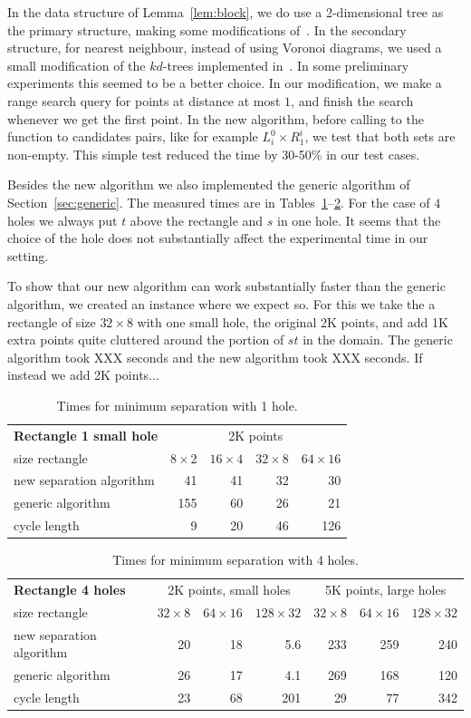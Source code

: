 \documentclass[a4paper,11pt]{article}
\begin{document}
In the data structure of Lemma~\ref{lem:block},
we do use a 2-dimensional tree as the primary structure, making some modifications
of~\cite{cgal:n-rstd-15a}. In the secondary structure, for nearest neighbour, 
instead of using Voronoi diagrams, we used a small modification of
the $kd$-trees implemented in~\cite{cgal:tf-ssd-15a}. 
In some preliminary experiments this seemed to be a better choice.
In our modification, we make a range search query for points at distance at most $1$,
and finish the search whenever we get the first point.
%
In the new algorithm, before calling to the function to candidates pairs, like for example $L_i^0\times R^i_1$,
we test that both sets are non-empty. This simple test reduced the time by 30-50\%
in our test cases.

Besides the new algorithm we also implemented the generic algorithm of Section~\ref{sec:generic}.
The measured times are in Tables~\ref{table6}--\ref{table7}.
For the case of $4$ holes we always put $t$ above the rectangle and $s$ in one hole. 
It seems that the choice of the hole does not substantially affect the experimental time in our setting.

To show that our new algorithm can work substantially faster than the generic algorithm,
we created an instance where we expect so.
For this we take the a rectangle of size $32\times 8$ with one small hole,
the original 2K points, and add 1K extra points quite cluttered
around the portion of $st$ in the domain. The generic algorithm took XXX seconds and the new
algorithm took XXX seconds. If instead we add 2K points...


\begin{table}[ht]
\begin{tabular}{l*{4}{r}}
\textbf{Rectangle 1 small hole} & \multicolumn{4}{c}{2K points}\\
size rectangle	&	$8\times 2$	&	$16\times 4$	&	$32\times 8$ & $64\times 16$ \\	
\hline
new separation algorithm	&	41	&	41	&	32	&	30  \\
generic algorithm			&	155	&	60	&	26	&	21 \\
cycle length				&   9   &   20  &   46  &   126
\end{tabular}
\caption{Times for minimum separation with 1 hole.}
\label{table6}
\end{table}

\begin{table}[ht]
\begin{tabular}{l*{3}{r}|*{3}{r}}
\textbf{Rectangle 4 holes} & \multicolumn{3}{c|}{2K points, small holes} & \multicolumn{3}{c}{5K points, large holes}\\
size rectangle	&	$32\times 8$ &	$64\times 16$ & $128\times 32$ & $32\times 8$ &	$64\times 16$ & $128\times 32$\\	
\hline
new separation algorithm	&	20	&	18	&	5.6	&	233 & 259 & 240  \\
generic algorithm			&	26	&	17	&	4.1	&	269 & 168 & 120 \\
cycle length				&	23  &   68	&	201 &	29	& 77  & 342 
\end{tabular}
\caption{Times for minimum separation with 4 holes.}
\label{table7}
\end{table}




\end{document}
